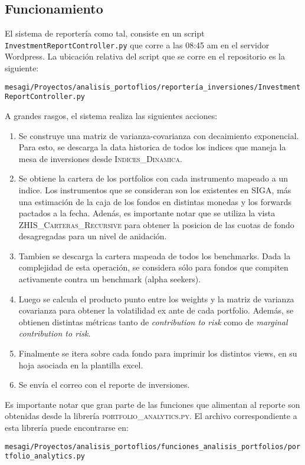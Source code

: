 \documentclass{article}
\begin{document}
\subsection{Funcionamiento}

El sistema de reportería como tal, consiste en un script \texttt{InvestmentReportController.py} que corre a las 08:45 am en el servidor Wordpress. La ubicación relativa del script que se corre en el repositorio es la siguiente:
\begin{center}
\texttt{mesagi/Proyectos/analisis\_portoflios/reportería\_inversiones/InvestmentReportController.py}
\end{center}

A grandes rasgos, el sistema realiza las siguientes acciones:


\begin{enumerate}
\item Se construye una matriz de varianza-covarianza con decaimiento exponencial. Para esto, se descarga la data historica de todos los indices que maneja la mesa de inversiones desde \textsc{Indices\_Dinamica}.
\item Se obtiene la cartera de los portfolios con cada instrumento mapeado a un indice. Los instrumentos que se consideran son los existentes en SIGA, más una estimación de la caja de los fondos en distintas monedas y los forwards pactados a la fecha. Adenás, es importante notar que se utiliza la vista \textsc{ZHIS\_Carteras\_Recursive} para obtener la posicion de las cuotas de fondo desagregadas para un nivel de anidación.
\item Tambien se descarga la cartera mapeada de todos los benchmarks. Dada la complejidad de esta operación, se considera sólo para fondos que compiten activamente contra un benchmark (alpha seekers).
\item Luego se calcula el producto punto entre los weights y la matriz de varianza covarianza para obtener la volatilidad ex ante de cada portfolio. Además, se obtienen distintas métricas tanto de \emph{contribution to risk} como de \emph{marginal contribution to risk}.
\item Finalmente se itera sobre cada fondo para imprimir los distintos views, en su hoja asociada en la plantilla excel.
\item Se envía el correo con el reporte de inversiones.
\end{enumerate}

Es importante notar que gran parte de las funciones que alimentan al reporte son obtenidas desde la librería \textsc{portfolio\_analytics.py}. El archivo correspondiente a esta librería puede encontrarse en: 
\begin{center}
\texttt{mesagi/Proyectos/analisis\_portoflios/funciones\_analisis\_portfolios/portfolio\_analytics.py}
\end{center}
\end{document}
